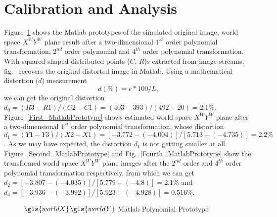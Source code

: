\section{Calibration and Analysis}
\label{sectionPrototypeTwoDtransformation} 
%
\indent
Figure~\ref{MatlabPrototpyeOfHighOrder} shows the Matlab prototypes of the simulated original image, world space \(X^WY^W\) plane result after a two-dimensional \(1^{st}\) order polynomial transformation, \(2^{nd}\) order polynomial and \(4^{th}\) order polynomial transformation. With squared-shaped distributed points (\(C,\, R\))s extracted from image streams, fig.~ recovers the original distorted image in Matlab. Using a mathematical distortion (\(d\)) measurement \cite{distortionMeasurement_2012}
%
\begin{equation}
d (\%)=  e*100/L ,
\label{mathematicalDistortion}
\end{equation}%
%
\noindent
we can get the original distortion \(d_0 = (R3 - R1) / (C2 -C1) = (403 - 393) / (492 - 20) = 2.1\%\). Figure~\ref{First_MatlabPrototype} shows estimated world space \(X^WY^W\) plane after a two-dimensional \(1^{st}\) order polynomial transformation, whose distortion \(d_1 = (Y1 - Y3) / (X2 -X1) = [-3.772 - (-4.004)] / [5.713 - (-4.735)] = 2.2\%\). As we may have expected, the distortion \(d_1\) is not getting smaller at all. %
\\\indent
Figure~\ref{Second_MatlabPrototype} and Fig.~\ref{Fourth_MatlabPrototype} show the transformed world space \(X^WY^W\) plane images after the \(2^{nd}\) order and \(4^{th}\) order polynomial transformation respectively, from which we can get \(d_2 = [-3.807 - (-4.035)] / [5.779 - (-4.8)] = 2.1\%\) and \(d_4 = [-3.936 - (-3.992)] / [5.923 - (-4.928)] = 0.516\%\). %
%
\begin{figure}[!t]
\hspace*{-0.3cm}
\centering
{}
{}

{}
%
\caption{\(\gls{worldX}\)\(\gls{worldY}\) Matlab Polynomial Prototype}
\label{MatlabPrototpyeOfHighOrder}
\end{figure}%
